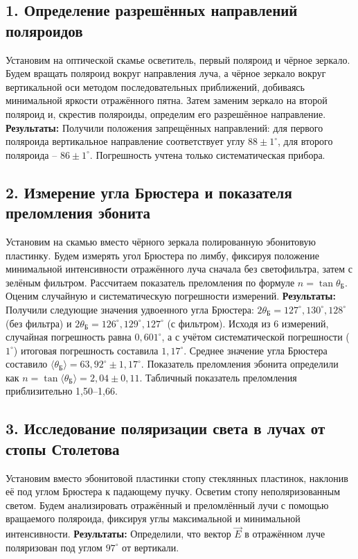 \documentclass[a4paper]{article}
\begin{document}
\subsection*{1. Определение разрешённых направлений поляроидов}
Установим на оптической скамье осветитель, первый поляроид и чёрное зеркало. Будем вращать поляроид вокруг направления луча, а чёрное зеркало вокруг вертикальной оси методом последовательных приближений, добиваясь минимальной яркости отражённого пятна. Затем заменим зеркало на второй поляроид и, скрестив поляроиды, определим его разрешённое направление.
\textbf{Результаты:} Получили положения запрещённых направлений: для первого поляроида вертикальное направление соответствует углу $88 \pm 1^\circ$, для второго поляроида -- $86 \pm 1^\circ$. Погрешность учтена только систематическая прибора.

\subsection*{2. Измерение угла Брюстера и показателя преломления эбонита}
Установим на скамью вместо чёрного зеркала полированную эбонитовую пластинку. Будем измерять угол Брюстера по лимбу, фиксируя положение минимальной интенсивности отражённого луча сначала без светофильтра, затем с зелёным фильтром. Рассчитаем показатель преломления по формуле $n = \tan \theta_{\text{Б}}$. Оценим случайную и систематическую погрешности измерений.
\textbf{Результаты:} Получили следующие значения удвоенного угла Брюстера: $2\theta_{\text{Б}} = 127^\circ, 130^\circ, 128^\circ$ (без фильтра) и $2\theta_{\text{Б}} = 126^\circ, 129^\circ, 127^\circ$ (с фильтром). Исходя из 6 измерений, случайная погрешность равна $0{,}601^\circ$, а с учётом систематической погрешности ($1^\circ$) итоговая погрешность составила $1{,}17^\circ$. Среднее значение угла Брюстера составило $\langle \theta_{\text{Б}} \rangle = 63,92^\circ \pm 1{,}17^\circ$.  Показатель преломления эбонита определили как $n = \tan \langle \theta_{\text{Б}} \rangle = 2{,}04 \pm 0,11$. Табличный показатель преломления приблизительно 1,50–1,66.

\subsection*{3. Исследование поляризации света в лучах от стопы Столетова}
Установим вместо эбонитовой пластинки стопу стеклянных пластинок, наклонив её под углом Брюстера к падающему пучку. Осветим стопу неполяризованным светом. Будем анализировать отражённый и преломлённый лучи с помощью вращаемого поляроида, фиксируя углы максимальной и минимальной интенсивности.
\textbf{Результаты:} Определили, что вектор $\vec{E}$ в отражённом луче поляризован под углом $97^\circ$ от вертикали.
\end{document}
